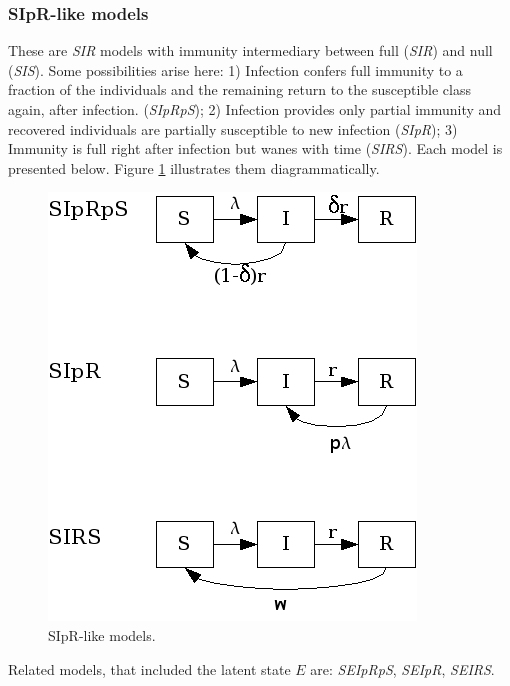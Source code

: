 \subsubsection{SIpR-like models}

These are \textit{SIR} models with immunity intermediary between full (\textit{SIR}) and null (\textit{SIS}). 
Some possibilities arise here: 1) Infection confers full immunity to a fraction of the individuals and the remaining return to the susceptible class again, after infection. (\textit{SIpRpS}); 2) Infection provides only partial immunity and recovered individuals are partially susceptible to new infection (\textit{SIpR}); 3) Immunity is full right after infection but wanes with time (\textit{SIRS}). Each model is presented below. Figure \ref{fig:sipr} illustrates them diagrammatically.


\begin{figure}
\begin{center}
\includegraphics[scale=0.8]{SIpRdiagram.png}
\caption{SIpR-like models.}
\label{fig:sipr}
\end{center}
\end{figure}

Related models, that included the latent state $E$ are: \textit{SEIpRpS}, \textit{SEIpR}, \textit{SEIRS}.



